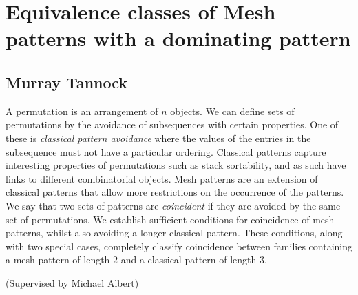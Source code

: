 \section{Equivalence classes of Mesh patterns with a dominating
pattern}\label{equivalence-classes-of-mesh-patterns-with-a-dominating-pattern}

\subsection{Murray Tannock}\label{murray-tannock}

A permutation is an arrangement of \(n\) objects. We can define sets of
permutations by the avoidance of subsequences with certain properties.
One of these is \emph{classical pattern avoidance} where the values of
the entries in the subsequence must not have a particular ordering.
Classical patterns capture interesting properties of permutations such
as stack sortability, and as such have links to different combinatorial
objects. Mesh patterns are an extension of classical patterns that allow
more restrictions on the occurrence of the patterns. We say that two
sets of patterns are \emph{coincident} if they are avoided by the same
set of permutations. We establish sufficient conditions for coincidence
of mesh patterns, whilst also avoiding a longer classical pattern. These
conditions, along with two special cases, completely classify
coincidence between families containing a mesh pattern of length \(2\)
and a classical pattern of length \(3\).

(Supervised by Michael Albert)
